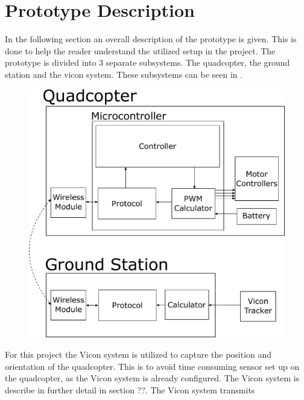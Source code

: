 \section{Prototype Description}
In the following section an overall description of the prototype is given. This is done to help the reader understand the utilized setup in the project.
The prototype is divided into 3 separate subsystems. The quadcopter, the ground station and the vicon system. These subsystems can be seen in . 

\begin{figure}[H] 
	\includegraphics[scale=.5]{figures/prototypediagram}
	\centering
	\captionsetup{justification=centering}
	\label{prototypediagram}
\end{figure}


For this project the Vicon system is utilized to capture the position and orientation of the quadcopter. This is to avoid time consuming sensor set up on the quadcopter, as the Vicon system is already configured. The Vicon system is describe in further detail in section ??. The Vicon system transmits 

